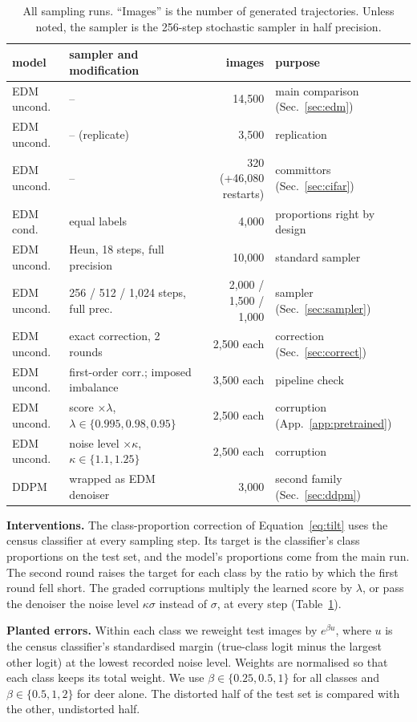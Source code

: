 \documentclass[11pt]{article}
\newcommand{\para}[1]{\textbf{#1}\hspace{0.6em}}
\begin{document}
\begin{table}[t]
\centering
\caption{All sampling runs. ``Images'' is the number of generated trajectories. Unless noted, the sampler is the 256-step stochastic sampler in half precision.}
\label{tab:runs}
\footnotesize\setlength{\tabcolsep}{4pt}
\begin{tabular}{llrl}
\toprule
model & sampler and modification & images & purpose \\
\midrule
EDM uncond. & -- & 14{,}500 & main comparison (Sec.~\ref{sec:edm}) \\
EDM uncond. & -- (replicate) & 3{,}500 & replication \\
EDM uncond. & -- & 320 (+46{,}080 restarts) & committors (Sec.~\ref{sec:cifar}) \\
EDM cond. & equal labels & 4{,}000 & proportions right by design \\
EDM uncond. & Heun, 18 steps, full precision & 10{,}000 & standard sampler \\
EDM uncond. & 256 / 512 / 1{,}024 steps, full prec. & 2{,}000 / 1{,}500 / 1{,}000 & sampler (Sec.~\ref{sec:sampler}) \\
EDM uncond. & exact correction, 2 rounds & 2{,}500 each & correction (Sec.~\ref{sec:correct}) \\
EDM uncond. & first-order corr.; imposed imbalance & 3{,}500 each & pipeline check \\
EDM uncond. & score $\times\lambda$, $\lambda\in\{0.995,0.98,0.95\}$ & 2{,}500 each & corruption (App.~\ref{app:pretrained}) \\
EDM uncond. & noise level $\times\kappa$, $\kappa\in\{1.1,1.25\}$ & 2{,}500 each & corruption \\
DDPM & wrapped as EDM denoiser & 3{,}000 & second family (Sec.~\ref{sec:ddpm}) \\
\bottomrule
\end{tabular}
\end{table}

\para{Interventions.}
The class-proportion correction of Equation~\eqref{eq:tilt} uses the census classifier at every sampling step. Its target is the classifier's class proportions on the test set, and the model's proportions come from the main run. The second round raises the target for each class by the ratio by which the first round fell short. The graded corruptions multiply the learned score by $\lambda$, or pass the denoiser the noise level $\kappa\sigma$ instead of $\sigma$, at every step (Table~\ref{tab:runs}).

\para{Planted errors.}
Within each class we reweight test images by $e^{\beta u}$, where $u$ is the census classifier's standardised margin (true-class logit minus the largest other logit) at the lowest recorded noise level. Weights are normalised so that each class keeps its total weight. We use $\beta\in\{0.25,0.5,1\}$ for all classes and $\beta\in\{0.5,1,2\}$ for deer alone. The distorted half of the test set is compared with the other, undistorted half.
\end{document}
